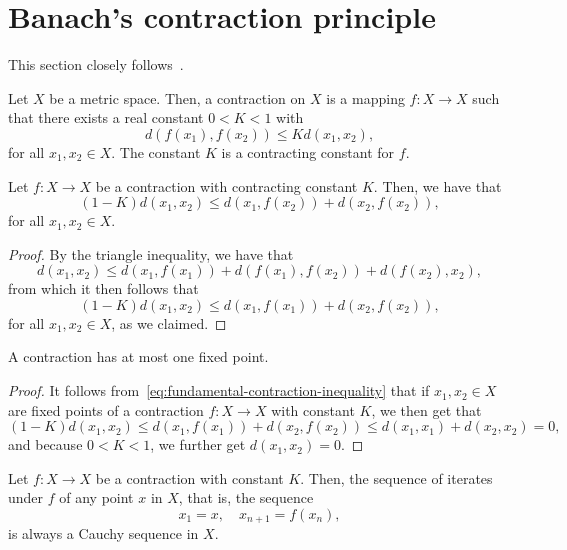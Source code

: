 \section{Banach's contraction principle}

This section closely follows~\cite{a_simple_proof_of_the_banach_contraction_principle}.

\begin{definition}\label{def:contracting-mapping}
  Let \(X\) be a metric space. Then, a contraction on \(X\) is a mapping
  \(f:X\to{X}\) such that there exists a real constant \(0<K<1\) with
  \[
    d(f(x_{1}),f(x_{2}))\leqslant{Kd(x_{1},x_{2})},
  \]
  for all \(x_{1},x_{2}\in{X}\). The constant \(K\) is a contracting constant
  for \(f\).
\end{definition}

\begin{proposition}
  Let \(f:X\to{X}\) be a contraction with contracting constant \(K\). Then, we
  have that
  \begin{equation}\label{eq:fundamental-contraction-inequality}
    (1-K)d(x_{1},x_{2})\leqslant{d(x_{1},f(x_{2}))+d(x_{2},f(x_{2}))},
  \end{equation}
  for all \(x_{1},x_{2}\in{X}\).
\end{proposition}

\begin{proof}
  By the triangle inequality, we have that
  \[
    d(x_{1},x_{2})\leqslant{d(x_{1},f(x_{1}))+d(f(x_{1}),f(x_{2}))+d(f(x_{2}),x_{2})},
  \]
  from which it then follows that
  \[
    (1-K)d(x_{1},x_{2})\leqslant{d(x_{1},f(x_{1}))+d(x_{2},f(x_{2}))},
  \]
  for all \(x_{1},x_{2}\in{X}\), as we claimed.
\end{proof}

\begin{corollary}
  A contraction has at most one fixed point.
\end{corollary}

\begin{proof}
  It follows from~\eqref{eq:fundamental-contraction-inequality} that if
  \(x_{1},x_{2}\in{X}\) are fixed points of a contraction \(f:X\to{X}\) with
  constant \(K\), we then get that
  \[
    (1-K)d(x_{1},x_{2})
    \leqslant{d(x_{1},f(x_{1}))+d(x_{2},f(x_{2}))}
    \leqslant{d(x_{1},x_{1})+d(x_{2},x_{2})}
    =0,
  \]
  and because \(0<K<1\), we further get \(d(x_{1},x_{2})=0\).
\end{proof}

\begin{proposition}\label{proposition:the-iterates-of-any-point-under-a-contraction-is-always-a-cauchy-sequence}
  Let \(f:X\to{X}\) be a contraction with constant \(K\). Then, the sequence of
  iterates under \(f\) of any point \(x\) in \(X\), that is, the sequence
  \[
    x_{1}=x,\quad{x_{n+1}=f(x_{n})},
  \]
  is always a Cauchy sequence in \(X\).
\end{proposition}


